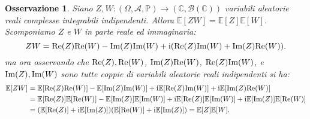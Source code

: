\documentclass[11pt]{book}
\theoremstyle{Definizione}
\theoremstyle{TeoremaProposizioneLemmaCorollario}
\theoremstyle{OsservazioneNota}
\newtheorem{myobs}{Osservazione}[section]
\newcommand{\C}{\mathbb{C}}
\renewcommand{\Re}{\textup{Re}}
\renewcommand{\Im}{\textup{Im}}
\renewcommand{\P}{\mathbb{P}}
\renewcommand{\i}{\textup{i}}
\newcommand{\E}{\mathbb{E}}
\begin{document}
\noindent
\begin{myobs}
Siano $Z,W:(\Omega,\mathcal{A},\P)\longrightarrow (\C,\mathcal{B}(\C))$ variabili aleatorie reali complesse integrabili indipendenti. Allora $\E[ZW] = \E[Z]\E[W]$. Scomponiamo $Z$ e $W$ in parte reale ed immaginaria:
$$
ZW = \Re(Z)\Re(W)-\Im(Z)\Im(W) + \i (\Re(Z)\Im(W)+\Im(Z)\Re(W)).
$$
ma ora osservando che $\Re(Z),\Re(W)$, $\Im(Z)\Re(W)$, $\Re(Z)\Im(W)$, e $\Im(Z),\Im(W)$ sono tutte coppie di variabili aleatorie reali indipendenti si ha:
\begin{align*}
\E[ZW] &= \E[\Re(Z)\Re(W)]-\E[\Im(Z)\Im(W)]+\i\E[\Re(Z)\Im(W)]+\i\E[\Im(Z)\Re(W)]\\
       &= \E[\Re(Z)]\E[\Re(W)]-\E[\Im(Z)]\E[\Im(W)]+\i\E[\Re(Z)]\E[\Im(W)]+\i\E[\Im(Z)]\E[\Re(W)]\\
       &= (\E[\Re(Z)]+\i\E[\Im(Z)])(\E[\Re(W)]+\i\E[\Im(Z)]) = \E[Z]\E[W].
\end{align*}
\end{myobs}
\end{document}
